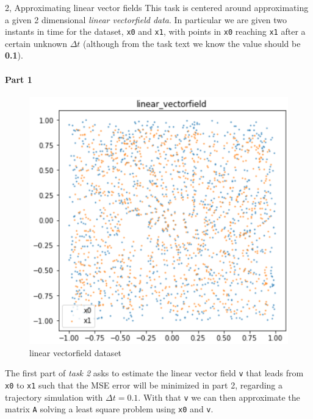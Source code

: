 \documentclass[10pt,a4paper]{article}
\begin{document}
\begin{task}{2, Approximating linear vector fields}
This task is centered around approximating a given 2 dimensional \textit{linear vectorfield data}. In particular we are given two instants in time for the dataset, \texttt{x0} and \texttt{x1}, with points in \texttt{x0} reaching \texttt{x1} after a certain unknown $\Delta t$ (although from the task text we know the value should be \textbf{0.1}).\\
\paragraph{Part 1}
\begin{figure}[H]
    \centering
    \includegraphics[scale=0.5]{images/task2_data.png}
    \caption{linear vectorfield dataset}
    \label{fig:t2-data}
\end{figure}
The first part of \textit{task 2} asks to estimate the linear vector field \texttt{v} that leads from \texttt{x0} to \texttt{x1} such that the MSE error will be minimized in part 2, regarding a trajectory simulation with $\Delta t = 0.1$. With that \texttt{v} we can then approximate the matrix \texttt{A} solving a least square problem using \texttt{x0} and \texttt{v}. 


\end{task}
\end{document}
